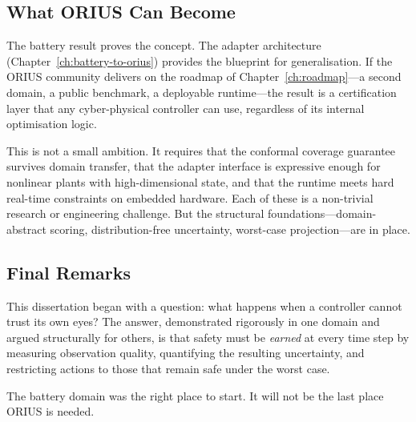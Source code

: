 \subsection{What ORIUS Can Become}

The battery result proves the concept.  The adapter architecture
(Chapter~\ref{ch:battery-to-orius}) provides the blueprint for
generalisation.  If the ORIUS community delivers on the roadmap of
Chapter~\ref{ch:roadmap}---a second domain, a public benchmark,
a deployable runtime---the result is a certification layer that any
cyber-physical controller can use, regardless of its internal optimisation
logic.

This is not a small ambition.  It requires that the conformal coverage
guarantee survives domain transfer, that the adapter interface is
expressive enough for nonlinear plants with high-dimensional state, and
that the runtime meets hard real-time constraints on embedded hardware.
Each of these is a non-trivial research or engineering challenge.  But
the structural foundations---domain-abstract scoring, distribution-free
uncertainty, worst-case projection---are in place.

\subsection{Final Remarks}

This dissertation began with a question: what happens when a controller
cannot trust its own eyes?  The answer, demonstrated rigorously in one
domain and argued structurally for others, is that safety must be
\emph{earned} at every time step by measuring observation quality,
quantifying the resulting uncertainty, and restricting actions to those
that remain safe under the worst case.

The battery domain was the right place to start.  It will not be the
last place ORIUS is needed.
